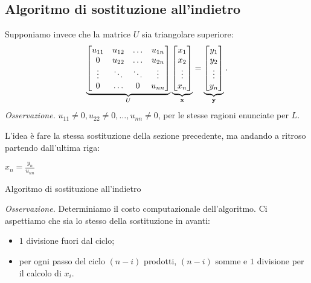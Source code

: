 \subsection{Algoritmo di sostituzione all'indietro}
Supponiamo invece che la matrice $\displaystyle U$ sia triangolare superiore:
\begin{equation}
\underbrace{\begin{bmatrix}
u_{11} & u_{12} & \dotsc  & u_{1n}\\
0 & u_{22} & \dotsc  & u_{2n}\\
\vdots  & \ddots  & \ddots  & \vdots \\
0 & \dotsc  & 0 & u_{nn}
\end{bmatrix}}_{U}\underbrace{\begin{bmatrix}
x_{1}\\
x_{2}\\
\vdots \\
x_{n}
\end{bmatrix}}_{\mathbf{x}} =\underbrace{\begin{bmatrix}
y_{1}\\
y_{2}\\
\vdots \\
y_{n}
\end{bmatrix}}_{\mathbf{y}}.
\label{eq:Ux-y}
\end{equation}
\textit{Osservazione.} $\displaystyle u_{11} \neq 0,u_{22} \neq 0,\dotsc ,u_{nn} \neq 0$, per le stesse ragioni enunciate per $L$.

L'idea è fare la stessa sostituzione della sezione precedente, ma andando a ritroso partendo dall'ultima riga:

\begin{algo}
    $x_{n} =\frac{y_{n}}{u_{nn}}$\;
    \caption{Algoritmo di sostituzione all'indietro}
\end{algo}
\textit{Osservazione.} Determiniamo il costo computazionale dell'algoritmo.
Ci aspettiamo che sia lo stesso della sostituzione in avanti:
\begin{itemize}
\item $1$ divisione fuori dal ciclo;
\item per ogni passo del ciclo $( n-i)$ prodotti, $( n-i)$ somme e $1$ divisione per il calcolo di $x_{i}$.
\end{itemize}

